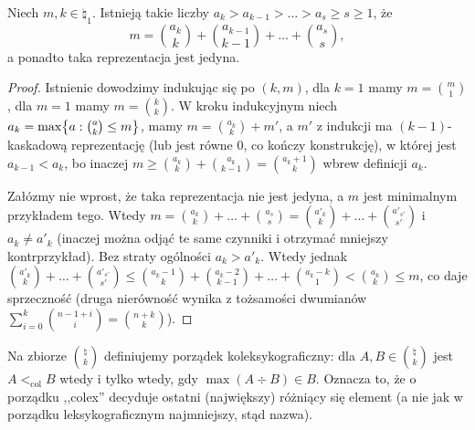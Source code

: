 \begin{theorem}
	Niech \(m,k\in\natural_1\). Istnieją takie liczby \(a_k > a_{k-1} > \ldots > a_s \ge s
	\ge 1\), że
	\[m = \binom{a_k}{k} + \binom{a_{k-1}}{k-1} + \ldots + \binom{a_s}{s},\]
	a ponadto taka reprezentacja jest jedyna.
\end{theorem}
\begin{proof}
	Istnienie dowodzimy indukując się po \((k,m)\), dla \(k=1\) mamy \(m =
	\binom{m}{1}\), dla \(m=1\) mamy \(m = \binom{k}{k}\). W kroku indukcyjnym niech
	\(a_k = \max\set{a : \binom{a}{k}\le m}\), mamy \(m = \binom{a_k}{k} + m'\), a
	\(m'\) z indukcji ma \((k-1)\)-kaskadową reprezentację (lub jest równe \(0\), co
	kończy konstrukcję), w której jest \(a_{k-1} < a_k\), bo inaczej \(m \ge
	\binom{a_k}{k} + \binom{a_k}{k-1} = \binom{a_k+1}{k}\) wbrew definicji \(a_k\).

	Załózmy nie wprost, że taka reprezentacja nie jest jedyna, a \(m\) jest
	minimalnym przykładem tego. Wtedy \(m = \binom{a_k}{k} + \ldots +
	\binom{a_s}{s} = \binom{a'_k}{k} + \ldots + \binom{a'_{s'}}{s'}\) i \(a_k\ne
	a'_k\) (inaczej można odjąć te same czynniki i otrzymać mniejszy
	kontrprzykład). Bez straty ogólności \(a_k > a'_k\). Wtedy jednak
	\(\binom{a'_k}{k} + \ldots + \binom{a'_{s'}}{s'} \le \binom{a_k-1}{k} +
	\binom{a_k-2}{k-1} + \ldots + \binom{a_k-k}{1} < \binom{a_k}{k} \le m\), co
	daje sprzeczność (druga nierówność wynika z tożsamości dwumianów
	\(\sum_{i=0}^{k}\binom{n-1+i}{i} = \binom{n+k}{k}\)).
\end{proof}

\begin{definition}
	Na zbiorze \(\binom{\natural}{k}\) definiujemy porządek koleksykograficzny: dla
	\(A,B \in \binom{\natural}{k}\) jest \(A <_{\text{col}} B\) wtedy i tylko wtedy, gdy
	\(\max(A\div B)\in B\). Oznacza to, że o porządku ,,colex'' decyduje ostatni (największy)
	różniący się element (a nie jak w porządku leksykograficznym najmniejszy, stąd nazwa).
\end{definition}

